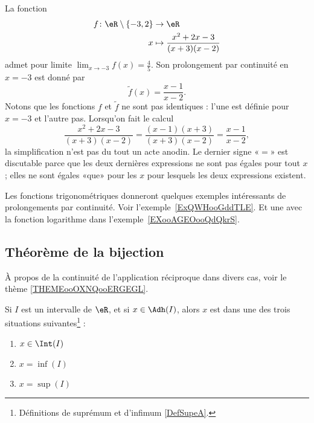 \begin{example}
	La fonction
	\begin{equation}
		\begin{aligned}
			f\colon \eR\setminus\{ -3,2 \} & \to \eR                                  \\
			x                              & \mapsto  \frac{ x^2+2x-3 }{ (x+3)(x-2) }
		\end{aligned}
	\end{equation}
	admet pour limite \( \lim_{x\to -3} f(x)=\frac{ 4 }{ 5 }\). Son prolongement par continuité en \( x=-3\) est donné par
	\begin{equation}
		\tilde f(x)=\frac{ x-1 }{ x-2 }.
	\end{equation}
	Notons que les fonctions \( f\) et \( \tilde f\) ne sont pas identiques : l'une est définie pour \( x=-3\) et l'autre pas. Lorsqu'on fait le calcul
	\begin{equation}
		\frac{ x^2+2x-3 }{ (x+3)(x-2) }=\frac{ (x-1)(x+3) }{ (x+3)(x-2) }=\frac{ x-1 }{ x-2 },
	\end{equation}
	la simplification n'est pas du tout un acte anodin. Le dernier signe «\( =\)» est discutable parce que les deux dernières expressions ne sont pas égales pour tout \( x\); elles ne sont égales «que» pour les \( x\) pour lesquels les deux expressions existent.
\end{example}

Les fonctions trigonométriques donneront quelques exemples intéressants de prolongements par continuité. Voir l'exemple~\ref{ExQWHooGddTLE}. Et une avec la fonction logarithme dans l'exemple~\ref{EXooAGEOooQdQkrS}.

\subsection{Théorème de la bijection}

À propos de la continuité de l'application réciproque dans divers cas, voir le thème \ref{THEMEooOXNQooERGEGL}.

\begin{lemma}		\label{LEMooYUOOooByoQdr}
	Si \( I\) est un intervalle de \( \eR\), et si \( x\in \Adh(I)\), alors \( x\) est dans une des trois situations suivantes\footnote{Définitions de suprémum et d'infimum \ref{DefSupeA}.} :
	\begin{enumerate}
		\item
		      \( x\in \Int(I)\)
		\item
		      \( x=\inf(I)\)
		\item
		      \( x=\sup(I)\)
	\end{enumerate}
\end{lemma}

